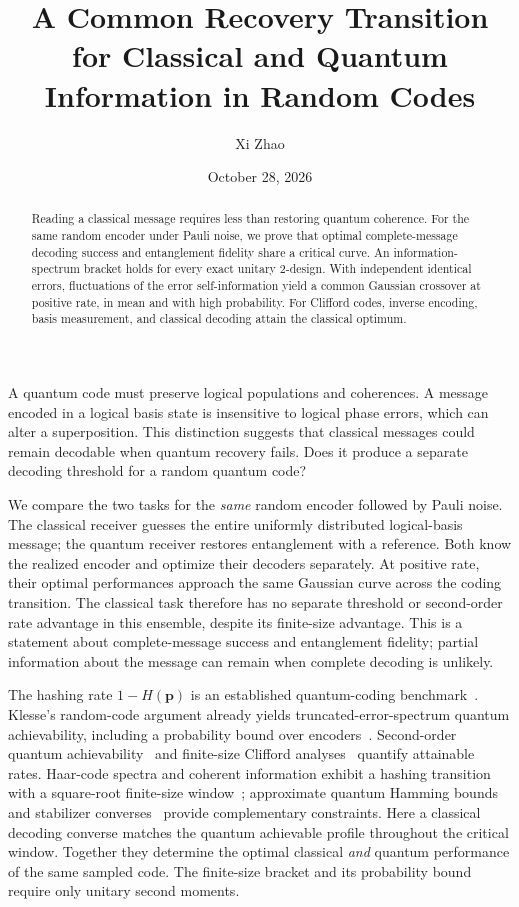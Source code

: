 \documentclass[aps,prl,reprint,superscriptaddress,amsmath,amssymb]{revtex4-2}
\begin{document}
\title{A Common Recovery Transition for Classical and Quantum Information in Random Codes}
\author{Xi Zhao}\noaffiliation
\date{October 28, 2026}
\begin{abstract}
Reading a classical message requires less than restoring quantum coherence.
For the same random encoder under Pauli noise, we prove that optimal
complete-message decoding success and entanglement fidelity share a critical
curve. An information-spectrum bracket holds for every exact unitary 2-design.
With independent identical errors, fluctuations of the error self-information
yield a common Gaussian crossover at positive rate, in mean and with high
probability. For Clifford codes, inverse encoding, basis measurement, and
classical decoding attain the classical optimum.
\end{abstract}
\maketitle

A quantum code must preserve logical populations and coherences. A message
encoded in a logical basis state is insensitive to logical phase errors,
which can alter a superposition. This distinction suggests that classical messages
could remain decodable when quantum recovery fails. Does it produce a
separate decoding threshold for a random quantum code?

We compare the two tasks for the \emph{same} random encoder followed by
Pauli noise. The classical receiver guesses the entire uniformly distributed
logical-basis message; the quantum receiver restores entanglement with a
reference. Both know the realized encoder and optimize their decoders
separately. At positive rate, their optimal performances approach the same
Gaussian curve across the coding transition. The classical task therefore
has no separate threshold or second-order rate advantage in this ensemble,
despite its finite-size advantage. This is a statement about complete-message
success and entanglement fidelity; partial information about the message
can remain when complete decoding is unlikely.

The hashing rate $1-H(\bm p)$ is an established quantum-coding
benchmark~\cite{Bennett,Devetak}. Klesse's random-code argument already yields
truncated-error-spectrum quantum achievability, including a probability
bound over encoders~\cite{Klesse}.
Second-order quantum achievability~\cite{TBR} and finite-size Clifford
analyses~\cite{Darmawan} quantify attainable rates. Haar-code spectra and
coherent information exhibit a hashing transition with a square-root
finite-size window~\cite{Sommers}; approximate quantum Hamming
bounds~\cite{MaTanWright} and stabilizer converses~\cite{StabilizerConverse}
provide complementary constraints. Here a classical decoding converse
matches the quantum achievable profile throughout the critical window.
Together they determine the optimal classical \emph{and} quantum performance
of the same sampled code. The finite-size bracket and its probability bound
require only unitary second moments.
\end{document}
